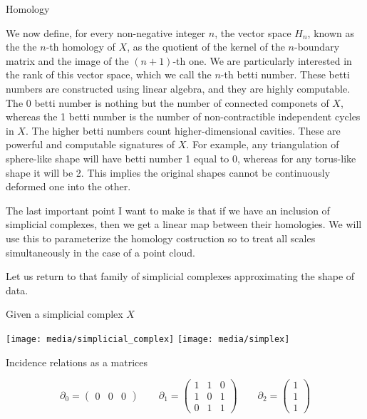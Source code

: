 {\begin{frame}[c]{Homology}
{			We now define, for every non-negative integer $n$, the vector space $H_n$, known as the the $n$-th homology of $X$, as the quotient of the kernel of the $n$-boundary matrix and the image of the $(n+1)$-th one. We are particularly interested in the rank of this vector space, which we call the $n$-th betti number.
			These betti numbers are constructed using linear algebra, and they are highly computable.
			The 0 betti number is nothing but the number of connected componets of $X$, whereas the 1 betti number is the number of non-contractible independent cycles in $X$. The higher betti numbers count higher-dimensional cavities. These are powerful and computable signatures of $X$.
			For example, any triangulation of sphere-like shape will have betti number 1 equal to 0, whereas for any torus-like shape it will be 2. This implies the original shapes cannot be continuously deformed one into the other. \press

			The last important point I want to make is that if we have an inclusion of simplicial complexes, then we get a linear map between their homologies. We will use this to parameterize the homology costruction so to treat all scales simultaneously in the case of a point cloud.

			Let us return to that family of simplicial complexes approximating the shape of data.
		}

		\vskip -15pt

		Given a simplicial complex $X$
		\begin{center}
			\texttt{[image: media/simplicial\_complex]}
			\qquad\qquad
			\pause
			\texttt{[image: media/simplex]}
		\end{center}

		Incidence relations as a matrices

		\begin{equation*}
			\partial_0 =
			\begin{pmatrix}
				0 & 0 & 0
			\end{pmatrix}
			\qquad
			\partial_1 =
			\begin{pmatrix}
				1 & 1 & 0 \\
				1 & 0 & 1 \\
				0 & 1 & 1
			\end{pmatrix}
			\qquad
			\partial_2 =
			\begin{pmatrix}
				1 \\
				1 \\
				1
			\end{pmatrix}
		\end{equation*}


\end{frame}}
